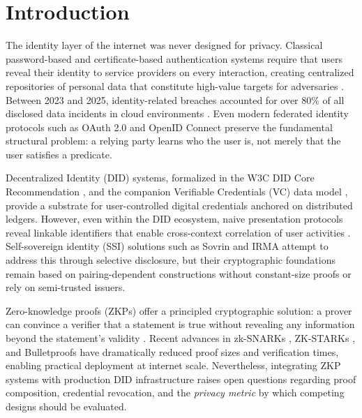 \documentclass[journal,12pt,onecolumn]{IEEEtran}
\begin{document}
\section{Introduction}

The identity layer of the internet was never designed for privacy.
Classical password-based and certificate-based authentication systems
require that users reveal their identity to service providers on every
interaction, creating centralized repositories of personal data that
constitute high-value targets for adversaries \cite{nist_sp800_63_2024}.
Between 2023 and 2025, identity-related breaches accounted for over
80\% of all disclosed data incidents in cloud environments
\cite{chowdhury2024gdpr}. Even modern federated identity protocols such
as OAuth 2.0 and OpenID Connect preserve the fundamental structural
problem: a relying party learns who the user is, not merely
that the user satisfies a predicate.

Decentralized Identity (DID) systems, formalized in the W3C DID Core
Recommendation \cite{did_core_2022}, and the companion Verifiable
Credentials (VC) data model \cite{vc_data_model_2024}, provide a
substrate for user-controlled digital credentials anchored on
distributed ledgers. However, even within the DID ecosystem, naive
presentation protocols reveal linkable identifiers that enable
cross-context correlation of user activities \cite{ding2024linkability}.
Self-sovereign identity (SSI) solutions such as Sovrin and
IRMA \cite{miret2024sovrin} attempt to address this through selective
disclosure, but their cryptographic foundations remain based on
pairing-dependent constructions without constant-size proofs or rely on
semi-trusted issuers.

Zero-knowledge proofs (ZKPs) offer a principled cryptographic solution:
a prover can convince a verifier that a statement is true without
revealing any information beyond the statement's validity
\cite{goldwasser1989knowledge}. Recent advances in zk-SNARKs
\cite{groth2016size,gennaro2013quadratic}, ZK-STARKs
\cite{bensasson2019scalable}, and Bulletproofs \cite{bunz2018bulletproofs}
have dramatically reduced proof sizes and verification times, enabling
practical deployment at internet scale. Nevertheless, integrating ZKP
systems with production DID infrastructure raises open questions
regarding proof composition, credential revocation, and the
\emph{privacy metric} by which competing designs should be evaluated.
\end{document}
